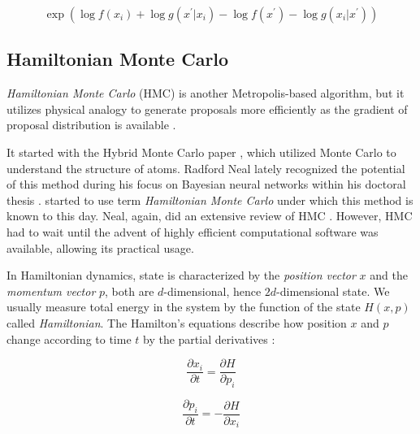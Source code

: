 \documentclass[
  digital, %
  oneside, %
  lof,     %
  lot,     %
]{fithesis4}
\begin{document}
\begin{equation}
  \exp \left( \log f(x_{i}) + \log g(x^{\prime} | x_{i}) - \log f(x^\prime) - \log g(x_{i} | x^{\prime}) \right)
\end{equation}


\subsection{Hamiltonian Monte Carlo}

\textit{Hamiltonian Monte Carlo} (HMC) is another Metropolis-based algorithm, but it utilizes physical analogy to generate proposals more efficiently as the gradient of proposal distribution is available \cite{betancourt2018}.

It started with the Hybrid Monte Carlo paper \cite{duane1987}, which utilized Monte Carlo to understand the structure of atoms. 
Radford Neal lately recognized the potential of this method during his focus on Bayesian neural networks within his doctoral thesis \cite{neal1995}. 
\cite{mackay2003} started to use term \textit{Hamiltonian Monte Carlo} under which this method is known to this day.
Neal, again, did an extensive review of HMC \cite{neal2011}.
However, HMC had to wait until the advent of highly efficient computational software was available, allowing its practical usage.

In Hamiltonian dynamics, state is characterized by the \textit{position vector} $x$ and the \textit{momentum vector} $p$, both are $d$-dimensional, hence $2d$-dimensional state.
We usually measure total energy in the system by the function of the state $H(x, p)$ called \textit{Hamiltonian}.
The Hamilton’s equations describe how position $x$ and $p$ change according to time $t$ by the partial derivatives \cite{neal2011}:

\begin{equation}
  \frac{\partial x_i}{\partial t} = \frac{\partial H}{\partial p_i}
\end{equation}

\begin{equation}
  \frac{\partial p_i}{\partial t} = - \frac{\partial H}{\partial x_i}
\end{equation}
\end{document}
